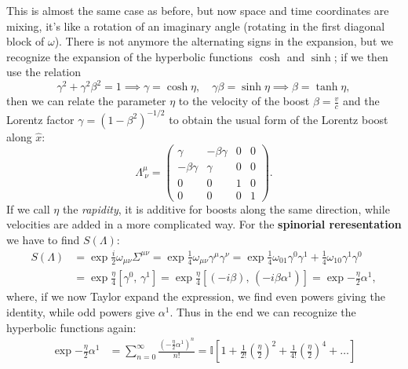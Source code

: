 \begin{example}
    This is almost the same case as before, but now space and time coordinates are mixing, it's like a rotation of an imaginary angle (rotating in the first diagonal block of \( \omega\)). There is not anymore the alternating signs in the expansion, but we recognize the expansion of the hyperbolic functions \(\cosh\) and \(\sinh\); if we then use the relation
    \[
        \gamma^2 + \gamma^2 \beta^2 = 1 \implies \gamma = \cosh{\eta}, \quad \gamma \beta = \sinh{\eta} \implies \beta = \tanh{\eta},
    \]
    then we can relate the parameter \(\eta\) to the velocity of the boost \(\beta = \frac{v}{c}\) and the Lorentz factor \(\gamma = \left(1-\beta^2\right)^{-1/2}\) to obtain the usual form of the Lorentz boost along \(\hat{x}\):
    \[
        \Lambda^{\mu}_{\ \nu} = \begin{pmatrix}
            \gamma        & -\beta \gamma & 0 & 0 \\
            -\beta \gamma & \gamma        & 0 & 0 \\
            0             & 0             & 1 & 0 \\
            0             & 0             & 0 & 1
        \end{pmatrix}.
    \]
    If we call \(\eta\) the \textit{rapidity}, it is additive for boosts along the same direction, while velocities are added in a more complicated way. For the \textbf{spinorial reresentation} we have to find \(S(\Lambda)\):
    \[
        \begin{aligned}
            S(\Lambda) & = \exp{\frac{i}{2} \omega_{\mu \nu} \Sigma^{\mu \nu}} = \exp{\frac{1}{4} \omega_{\mu \nu} \gamma^{\mu} \gamma^{\nu}} = \exp{\frac{1}{4}\omega_{01}\gamma^0 \gamma^1 + \frac{1}{4}\omega_{10}\gamma^1 \gamma^0} \\
                       & = \exp{\frac{\eta}{4} \left[\gamma^0,\, \gamma^1\right]} = \exp{\frac{\eta}{4} \left[(-i \beta),\,(-i \beta \alpha^1)\right]} = \exp{-\frac{\eta}{2} \alpha^1},
        \end{aligned}
    \]
    where, if we now Taylor expand the expression, we find even powers giving the identity, while odd powers give \(\alpha^1\). Thus in the end we can recognize the hyperbolic functions again:
    \[
        \begin{aligned}
            \exp{-\frac{\eta}{2} \alpha^1} & = \sum_{n=0}^{\infty} \frac{\left(-\frac{\eta}{2} \alpha^1\right)^n}{n!} = \mathbb{I} \left[1 + \frac{1}{2!}\left(\frac{\eta}{2}\right)^2 + \frac{1}{4!}\left(\frac{\eta}{2}\right)^4 + \dots \right]          \\

\end{aligned}\]
\end{example}
